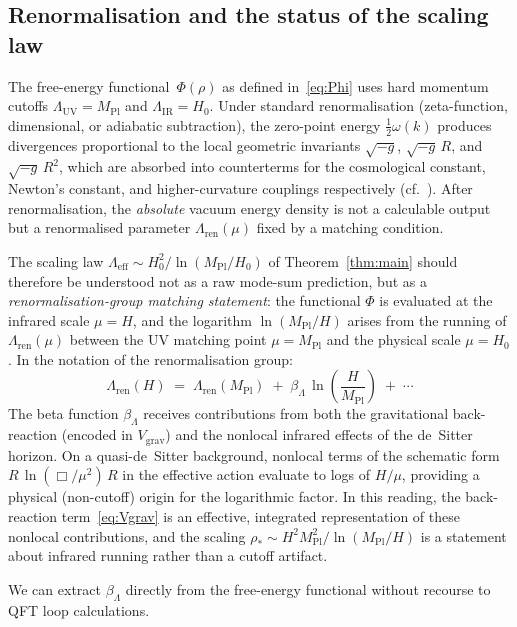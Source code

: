 \documentclass[12pt,a4paper]{article}
\theoremstyle{definition}
\theoremstyle{plain}
\theoremstyle{remark}
\newcommand{\Leff}{\Lambda_{\mathrm{eff}}}
\newcommand{\LUV}{\Lambda_{\mathrm{UV}}}
\newcommand{\LIR}{\Lambda_{\mathrm{IR}}}
\begin{document}
\subsection{Renormalisation and the status of the scaling law}
\label{sec:renorm}

The free-energy functional~$\Phi(\rho)$ as defined
in~\eqref{eq:Phi} uses hard momentum cutoffs $\LUV = M_{\mathrm{Pl}}$
and $\LIR = H_0$.  Under standard renormalisation
(zeta-function, dimensional, or adiabatic subtraction), the
zero-point energy $\tfrac{1}{2}\omega(k)$ produces divergences
proportional to the local geometric invariants $\sqrt{-g}$,
$\sqrt{-g}\,R$, and $\sqrt{-g}\,R^2$, which are absorbed into
counterterms for the cosmological constant, Newton's constant, and
higher-curvature couplings respectively (cf.~\cite{BirrellDavies1982}).
After renormalisation, the \emph{absolute} vacuum energy density is
not a calculable output but a renormalised parameter
$\Lambda_{\mathrm{ren}}(\mu)$ fixed by a matching condition.

The scaling law $\Leff \sim H_0^2/\ln(M_{\mathrm{Pl}}/H_0)$ of
Theorem~\ref{thm:main} should therefore be understood not as a raw
mode-sum prediction, but as a \emph{renormalisation-group matching
statement}: the functional $\Phi$ is evaluated at the infrared scale
$\mu = H$, and the logarithm $\ln(M_{\mathrm{Pl}}/H)$ arises from
the running of $\Lambda_{\mathrm{ren}}(\mu)$ between the UV matching
point $\mu = M_{\mathrm{Pl}}$ and the physical scale $\mu = H_0$.
In the notation of the renormalisation group:
\begin{equation}\label{eq:RG-running}
  \Lambda_{\mathrm{ren}}(H)
  \;=\; \Lambda_{\mathrm{ren}}(M_{\mathrm{Pl}})
  \;+\; \beta_\Lambda\,\ln\!\left(\frac{H}{M_{\mathrm{Pl}}}\right)
  \;+\; \cdots
\end{equation}
The beta function $\beta_\Lambda$ receives contributions from both the
gravitational back-reaction (encoded in $V_{\mathrm{grav}}$) and the
nonlocal infrared effects of the de~Sitter horizon.  On a
quasi-de~Sitter background, nonlocal terms of the schematic form
$R\,\ln(\Box/\mu^2)\,R$ in the effective action evaluate to logs of
$H/\mu$, providing a physical (non-cutoff) origin for the logarithmic
factor.  In this reading, the back-reaction term~\eqref{eq:Vgrav} is
an effective, integrated representation of these nonlocal
contributions, and the scaling $\rho_\ast \sim H^2 M_{\mathrm{Pl}}^2
/\ln(M_{\mathrm{Pl}}/H)$ is a statement about infrared running rather
than a cutoff artifact.

We can extract $\beta_\Lambda$ directly from the free-energy functional
without recourse to QFT loop calculations.
\end{document}

